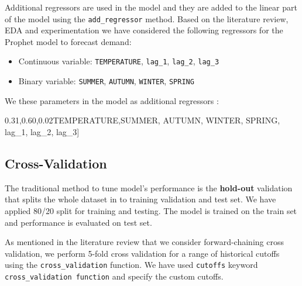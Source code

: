 \documentclass[mstat,12pt]{unswthesis}
\newenvironment{Shaded}{\begin{snugshade}}{\end{snugshade}}
\newcommand{\NormalTok}[1]{#1}
\newcommand{\StringTok}[1]{\textcolor[rgb]{0.31,0.60,0.02}{#1}}
\begin{document}
Additional regressors are used in the model and they are added to the
linear part of the model using the \texttt{add\_regressor} method. Based
on the literature review, EDA and experimentation we have considered the
following regressors for the Prophet model to forecast demand:

\begin{itemize}
\item
  Continuous variable: \texttt{TEMPERATURE}, \texttt{lag\_1},
  \texttt{lag\_2}, \texttt{lag\_3}
\item
  Binary variable: \texttt{SUMMER}, \texttt{AUTUMN}, \texttt{WINTER},
  \texttt{SPRING}
\end{itemize}

We these parameters in the model as additional regressors :

\begin{Shaded}
\begin{Highlighting}[]
\NormalTok{[}\StringTok{\textquotesingle{}TEMPERATURE\textquotesingle{}}\NormalTok{,}\StringTok{\textquotesingle{}SUMMER\textquotesingle{}}\NormalTok{, }\StringTok{\textquotesingle{}AUTUMN\textquotesingle{}}\NormalTok{, }\StringTok{\textquotesingle{}WINTER\textquotesingle{}}\NormalTok{, }\StringTok{\textquotesingle{}SPRING\textquotesingle{}}\NormalTok{, }
        \StringTok{\textquotesingle{}lag\_1\textquotesingle{}}\NormalTok{, }\StringTok{\textquotesingle{}lag\_2\textquotesingle{}}\NormalTok{, }\StringTok{\textquotesingle{}lag\_3\textquotesingle{}}\NormalTok{]}
\end{Highlighting}
\end{Shaded}

\subsection{Cross-Validation}\label{cross-validation}

The traditional method to tune model's performance is the
\textbf{hold-out} validation that splits the whole dataset in to
training validation and test set. We have applied 80/20 split for
training and testing. The model is trained on the train set and
performance is evaluated on test set.

As mentioned in the literature review that we consider forward-chaining
cross validation, we perform 5-fold cross validation for a range of
historical cutoffs using the \texttt{cross\_validation} function. We
have used \texttt{cutoffs} keyword \texttt{cross\_validation\ function}
and specify the custom cutoffs.
\end{document}
